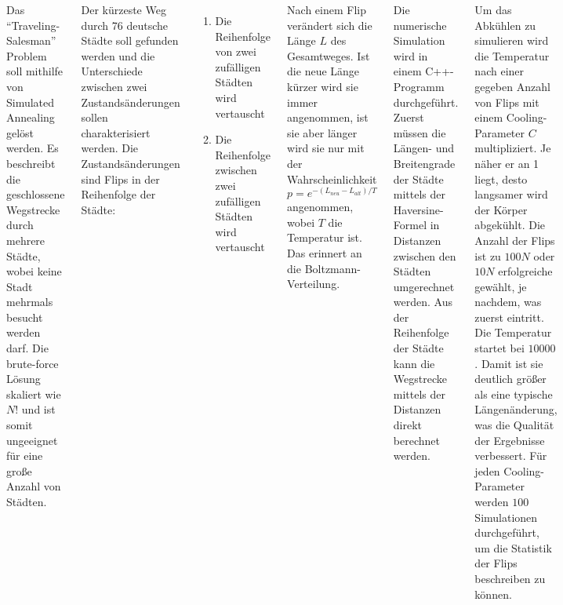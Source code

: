 \documentclass[35pt, a0paper, portrait]{tikzposter}
\begin{document}
\begin{columns}
  {
    Das ``Traveling-Salesman'' Problem soll mithilfe von Simulated Annealing gelöst werden. Es beschreibt die geschlossene Wegstrecke durch mehrere Städte, wobei keine Stadt mehrmals besucht werden darf. Die brute-force Lösung skaliert wie $N!$ und ist somit ungeeignet für eine große Anzahl von Städten.

    Der kürzeste Weg durch 76 deutsche Städte soll gefunden werden und die Unterschiede zwischen zwei Zustandsänderungen sollen charakterisiert werden. Die Zustandsänderungen sind Flips in der Reihenfolge der Städte:

    \begin{enumerate}[leftmargin=2.5cm, label=\arabic*)]
      \item Die Reihenfolge von zwei zufälligen Städten wird vertauscht
      \item Die Reihenfolge zwischen zwei zufälligen Städten wird vertauscht
    \end{enumerate}

    Nach einem Flip verändert sich die Länge $L$ des Gesamtweges. Ist die neue Länge kürzer wird sie immer angenommen, ist sie aber länger wird sie nur mit der Wahrscheinlichkeit
    \begin{equation}
      p = e^{- (L_{neu} - L_{alt})/T}
    \end{equation}
    angenommen, wobei $T$ die Temperatur ist. Das erinnert an die Boltzmann-Verteilung.
  }

  {
    Die numerische Simulation wird in einem C++-Programm durchgeführt. Zuerst müssen die Längen- und Breitengrade der Städte mittels der Haversine-Formel in Distanzen zwischen den Städten umgerechnet werden. Aus der Reihenfolge der Städte kann die Wegstrecke mittels der Distanzen direkt berechnet werden.

    Um das Abkühlen zu simulieren wird die Temperatur nach einer gegeben Anzahl von Flips mit einem Cooling-Parameter $C$ multipliziert. Je näher er an 1 liegt, desto langsamer wird der Körper abgekühlt.  Die Anzahl der Flips ist zu $100N$ oder $10N$ erfolgreiche gewählt, je nachdem, was zuerst eintritt. Die Temperatur startet bei $10000$. Damit ist sie deutlich größer als eine typische Längenänderung, was die Qualität der Ergebnisse verbessert. Für jeden Cooling-Parameter werden $100$ Simulationen durchgeführt, um die Statistik der Flips beschreiben zu können.
    }
\end{columns}
\end{document}
